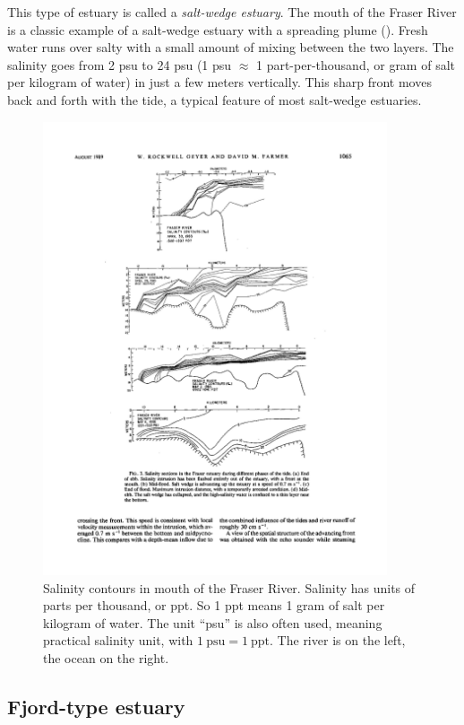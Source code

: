 This type of estuary is called a \emph{salt-wedge estuary}.  The mouth of the Fraser River is a classic example of a salt-wedge estuary with a spreading plume ().  Fresh water runs over salty with a small amount of mixing between the two layers.  The salinity goes from 2 psu to 24 psu (1 psu $\approx$ 1 part-per-thousand, or gram of salt per kilogram of water) in just a few meters vertically. This sharp front moves back and forth with the tide, a typical feature of most salt-wedge estuaries.

\begin{figure}[htb]
  \centering
  \includegraphics[width=4in]{figs/GeyerFarmerFig3}
  \caption{Salinity contours in mouth of the Fraser River. Salinity has units of parts per thousand, or ppt.  So 1 ppt means 1 gram of salt per kilogram of water. The unit ``psu'' is also often used, meaning practical salinity unit, with $1\ \mathrm{psu}=1\ \mathrm{ppt}$.  The river
    is on the left, the ocean on the right. \citep{geyerfarmer89} }
  \label{fig:GeyerFarmerFig3}
\end{figure}

\subsection{Fjord-type estuary}

